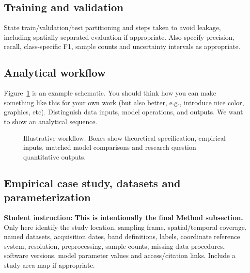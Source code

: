 \documentclass[11pt,letterpaper]{article}
\newcommand{\guide}[1]{\par\begingroup\color{blue!60!black}\small\textbf{Student
instruction:} #1\par\endgroup}
\begin{document}
\subsection{Training and validation}
State train/validation/test partitioning and steps taken to avoid leakage, including
spatially separated evaluation if appropriate. 
Also specify precision, recall, class-specific F1, sample counts and uncertainty intervals
as appropriate. 
\subsection{Analytical workflow}
Figure~\ref{fig:workflow} is an example schematic. You should think how you can make something 
like this for your own work (but also better, e.g., introduce nice color, graphics, etc). 
Distinguish data inputs, model operations, and outputs. We want to show an analytical sequence.
\begin{figure}[htbp]\centering
{}
\caption{Illustrative workflow. Boxes show theoretical specification,
empirical inputs, matched model comparisons and research question quantitative
outputs.}\label{fig:workflow}
\end{figure}
\subsection{Empirical case study, datasets and parameterization}
\guide{\textbf{This is intentionally the final Method subsection.} Only here identify the
study location, sampling frame, spatial/temporal coverage, named datasets, acquisition
dates, band definitions, labels, coordinate reference system, resolution, preprocessing,
sample counts, missing data procedures, software versions, model parameter values and
access/citation links. Include a study area map if appropriate.}
\end{document}
